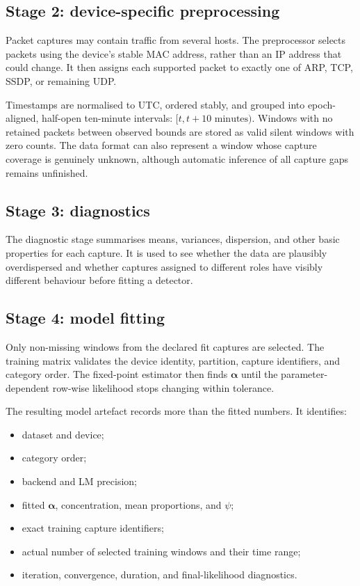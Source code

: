\documentclass[11pt,a4paper]{article}
\begin{document}
\subsection{Stage 2: device-specific preprocessing}

Packet captures may contain traffic from several hosts. The preprocessor selects packets using the device's stable MAC address, rather than an IP address that could change. It then assigns each supported packet to exactly one of ARP, TCP, SSDP, or remaining UDP.

Timestamps are normalised to UTC, ordered stably, and grouped into epoch-aligned, half-open ten-minute intervals: $[t,t+10\text{ minutes})$. Windows with no retained packets between observed bounds are stored as valid silent windows with zero counts. The data format can also represent a window whose capture coverage is genuinely unknown, although automatic inference of all capture gaps remains unfinished.

\subsection{Stage 3: diagnostics}

The diagnostic stage summarises means, variances, dispersion, and other basic properties for each capture. It is used to see whether the data are plausibly overdispersed and whether captures assigned to different roles have visibly different behaviour before fitting a detector.

\subsection{Stage 4: model fitting}

Only non-missing windows from the declared fit captures are selected. The training matrix validates the device identity, partition, capture identifiers, and category order. The fixed-point estimator then finds $\boldsymbol{\alpha}$ until the parameter-dependent row-wise likelihood stops changing within tolerance.

The resulting model artefact records more than the fitted numbers. It identifies:

\begin{itemize}
  \item dataset and device;
  \item category order;
  \item backend and LM precision;
  \item fitted $\boldsymbol{\alpha}$, concentration, mean proportions, and $\psi$;
  \item exact training capture identifiers;
  \item actual number of selected training windows and their time range;
  \item iteration, convergence, duration, and final-likelihood diagnostics.
\end{itemize}
\end{document}
